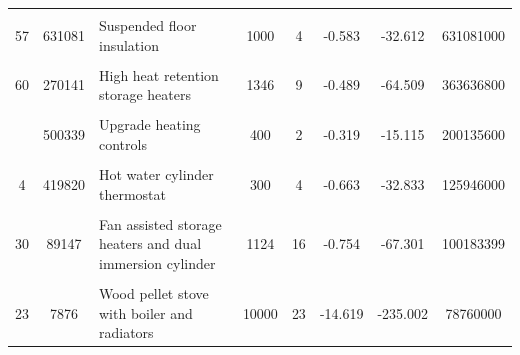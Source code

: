 \begin{table}[!h]
{\begin{tabular}[t]{cc p{6cm} ccccc}
\addlinespace
\cellcolor{gray!10}{47} & \cellcolor{gray!10}{973416} & \cellcolor{gray!10}{Floor insulation} & \cellcolor{gray!10}{1000} & \cellcolor{gray!10}{5} & \cellcolor{gray!10}{-0.630} & \cellcolor{gray!10}{-33.051} & \cellcolor{gray!10}{973416000}\\
57 & 631081 & Suspended floor insulation & 1000 & 4 & -0.583 & -32.612 & 631081000\\
\cellcolor{gray!10}{59} & \cellcolor{gray!10}{265470} & \cellcolor{gray!10}{High heat retention storage heaters and dual immersion cylinder} & \cellcolor{gray!10}{1501} & \cellcolor{gray!10}{17} & \cellcolor{gray!10}{-0.724} & \cellcolor{gray!10}{-85.813} & \cellcolor{gray!10}{398550111}\\
60 & 270141 & High heat retention storage heaters & 1346 & 9 & -0.489 & -64.509 & 363636800\\
\cellcolor{gray!10}{45} & \cellcolor{gray!10}{227797} & \cellcolor{gray!10}{Flat roof insulation} & \cellcolor{gray!10}{1175} & \cellcolor{gray!10}{4} & \cellcolor{gray!10}{-0.604} & \cellcolor{gray!10}{-35.291} & \cellcolor{gray!10}{267661475}\\
\addlinespace
11 & 500339 & Upgrade heating controls & 400 & 2 & -0.319 & -15.115 & 200135600\\
\cellcolor{gray!10}{48} & \cellcolor{gray!10}{140109} & \cellcolor{gray!10}{High performance external doors} & \cellcolor{gray!10}{1366} & \cellcolor{gray!10}{5} & \cellcolor{gray!10}{-0.215} & \cellcolor{gray!10}{-50.209} & \cellcolor{gray!10}{191332850}\\
4 & 419820 & Hot water cylinder thermostat & 300 & 4 & -0.663 & -32.833 & 125946000\\
\cellcolor{gray!10}{5} & \cellcolor{gray!10}{458914} & \cellcolor{gray!10}{Increase loft insulation to 270 mm} & \cellcolor{gray!10}{225} & \cellcolor{gray!10}{3} & \cellcolor{gray!10}{-0.452} & \cellcolor{gray!10}{-26.047} & \cellcolor{gray!10}{103255650}\\
30 & 89147 & Fan assisted storage heaters and dual immersion cylinder & 1124 & 16 & -0.754 & -67.301 & 100183399\\
\addlinespace
\cellcolor{gray!10}{25} & \cellcolor{gray!10}{82808} & \cellcolor{gray!10}{Fan assisted storage heaters} & \cellcolor{gray!10}{999} & \cellcolor{gray!10}{9} & \cellcolor{gray!10}{-0.751} & \cellcolor{gray!10}{-58.682} & \cellcolor{gray!10}{82704490}\\
23 & 7876 & Wood pellet stove with boiler and radiators & 10000 & 23 & -14.619 & -235.002 & 78760000\\

\end{tabular}}
\end{table}
